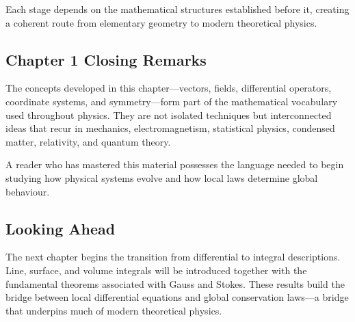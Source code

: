 Each stage depends on the mathematical structures established before it,
creating a coherent route from elementary geometry to modern theoretical
physics.

\subsection{Chapter 1 Closing Remarks}

The concepts developed in this chapter---vectors, fields, differential
operators, coordinate systems, and symmetry---form part of the mathematical
vocabulary used throughout physics. They are not isolated techniques but
interconnected ideas that recur in mechanics, electromagnetism, statistical
physics, condensed matter, relativity, and quantum theory.

A reader who has mastered this material possesses the language needed to begin
studying how physical systems evolve and how local laws determine global
behaviour.

\subsection*{Looking Ahead}

The next chapter begins the transition from differential to integral
descriptions. Line, surface, and volume integrals will be introduced together
with the fundamental theorems associated with Gauss and Stokes. These results
build the bridge between local differential equations and global conservation
laws---a bridge that underpins much of modern theoretical physics.
